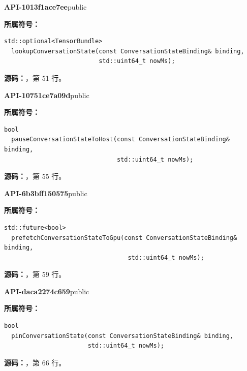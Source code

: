 \textbf{API-1013f1ace7ee}\quad public\par
\textbf{所属符号：}\par
\begin{Verbatim}[fontsize=\footnotesize,breaklines,breakanywhere]
std::optional<TensorBundle>
  lookupConversationState(const ConversationStateBinding& binding,
                          std::uint64_t nowMs);
\end{Verbatim}
\textbf{源码：}，第 51 行。\par

\textbf{API-10751ce7a09d}\quad public\par
\textbf{所属符号：}\par
\begin{Verbatim}[fontsize=\footnotesize,breaklines,breakanywhere]
bool
  pauseConversationStateToHost(const ConversationStateBinding& binding,
                               std::uint64_t nowMs);
\end{Verbatim}
\textbf{源码：}，第 55 行。\par

\textbf{API-6b3bff150575}\quad public\par
\textbf{所属符号：}\par
\begin{Verbatim}[fontsize=\footnotesize,breaklines,breakanywhere]
std::future<bool>
  prefetchConversationStateToGpu(const ConversationStateBinding& binding,
                                  std::uint64_t nowMs);
\end{Verbatim}
\textbf{源码：}，第 59 行。\par

\textbf{API-daca2274c659}\quad public\par
\textbf{所属符号：}\par
\begin{Verbatim}[fontsize=\footnotesize,breaklines,breakanywhere]
bool
  pinConversationState(const ConversationStateBinding& binding,
                       std::uint64_t nowMs);
\end{Verbatim}
\textbf{源码：}，第 66 行。\par

